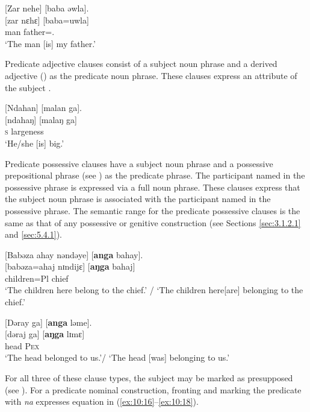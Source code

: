 \ea \label{ex:10:12}
{}[Zar  nehe]  [baba  əwla].\\
\gll  {}[zar   nɛhɛ]    [baba=uwla]\\
      man    {\DEM}    father={\oneS}.{\POSS}\\
\glt  ‘The man [is] my father.’ 
\z

Predicate adjective clauses consist of a subject noun phrase and a derived adjective %
() as the predicate noun phrase. These clauses express an attribute of the subject .

\ea \label{ex:10:13}
{}[Ndahan]  [malan  ga].\\
\gll  {}[ndahaŋ]  [malaŋ ga]\\
      \textsc{s}    largeness  {\ADJ}\\
\glt  ‘He/she [is] big.’
\z

Predicate possessive clauses have a subject noun phrase and a possessive prepositional phrase (see ) as the predicate phrase. The participant named in the possessive phrase is expressed via a full noun phrase. These clauses express that the subject noun phrase is associated with the participant named in the possessive phrase. The semantic range for the predicate possessive clauses is the same as that of any possessive or genitive construction (see Sections \ref{sec:3.1.2.1} and \ref{sec:5.4.1}).

\ea \label{ex:10:14}
{} [Babəza  ahay  nəndəye]  [\textbf{anga}  bahay].\\
\gll  {}[babəza=ahaj  nɪndijɛ]    [\textbf{aŋga}  bahaj]\\
      children=Pl  {\DEM}    {\POSS}  chief\\
\glt  ‘The children here belong to the chief.’ / ‘The children here[are] belonging to the chief.’ 
\z

\ea \label{ex:10:15}
{}[Dəray  ga]  [\textbf{anga}  ləme].\\
\gll  {}[dəraj  ga]    [\textbf{aŋga}  lɪmɛ]\\
      head  {\ADJ}    {\POSS}  \textsc{Pex}\\
\glt  ‘The head belonged to us.’/ ‘The head [was] belonging to us.’ 
\z

For all three of these clause types, the subject may be marked as presupposed (see ). For a predicate nominal construction, fronting and marking the predicate with \textit{na} expresses equation in (\ref{ex:10:16}--\ref{ex:10:18}).

